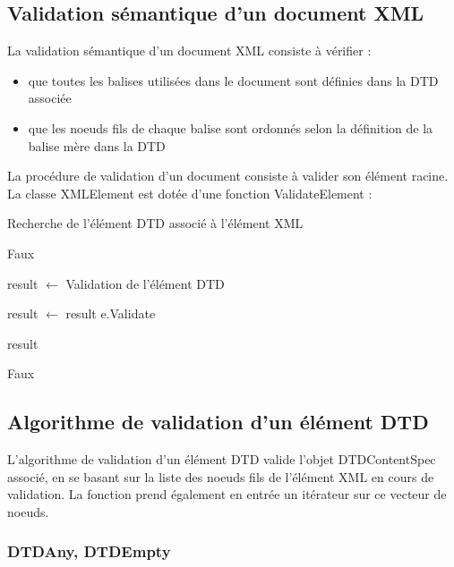 \subsection{Validation sémantique d'un document XML}

La validation sémantique d'un document XML consiste à vérifier : 

\begin{itemize}
\item que toutes les balises utilisées dans le document sont définies dans
la DTD associée
\item que les noeuds fils de chaque balise sont ordonnés selon la
définition de la balise mère dans la DTD \\
\end{itemize}

La procédure de validation d'un document consiste à valider son élément
racine.\\

La classe XMLElement est dotée d'une fonction ValidateElement : \\

\begin{algorithmic}
\STATE Recherche de l'élément DTD associé à l'élément XML

\RETURN Faux
\ENDIF

\STATE result $\gets$ Validation de l'élément DTD


\STATE result $\gets$ result \AND e.Validate
\ENDFOR

\RETURN result

\ELSE
\RETURN Faux
\ENDIF
\end{algorithmic}


\subsection{Algorithme de validation d'un élément DTD}

L'algorithme de validation d'un élément DTD valide l'objet DTDContentSpec
associé, en se basant sur la liste des noeuds fils de l'élément XML en
cours de validation. La fonction prend également en entrée un itérateur sur
ce vecteur de noeuds.

\subsubsection{DTDAny, DTDEmpty}

